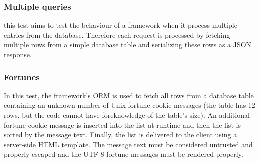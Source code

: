 \subsubsection{Multiple queries}
this test aims to test the behaviour of a framework when it process multiple entries from the database.
Therefore each request is processed by fetching multiple rows from a simple database table and serializing these rows as a JSON response.
\subsubsection{Fortunes}
In this test, the framework's ORM is used to fetch all rows from a database table containing an unknown number of Unix fortune cookie messages (the table has 12 rows, but the code cannot have foreknowledge of the table's size). An additional fortune cookie message is inserted into the list at runtime and then the list is sorted by the message text. Finally, the list is delivered to the client using a server-side HTML template. The message text must be considered untrusted and properly escaped and the UTF-8 fortune messages must be rendered properly.

